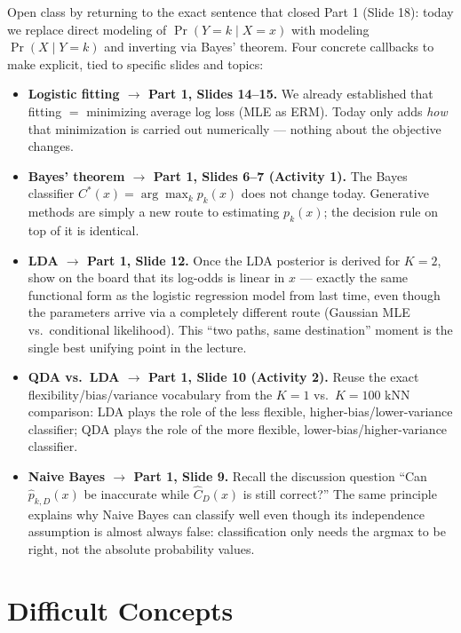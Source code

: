 \documentclass[11pt]{article}
\begin{document}
\begin{priorbox}
Open class by returning to the exact sentence that closed Part 1 (Slide 18): today we replace direct modeling of $\Pr(Y=k\mid X=x)$ with modeling $\Pr(X\mid Y=k)$ and inverting via Bayes' theorem. Four concrete callbacks to make explicit, tied to specific slides and topics:

\begin{itemize}
\item \textbf{Logistic fitting $\to$ Part 1, Slides 14--15.} We already established that fitting $=$ minimizing average log loss (MLE as ERM). Today only adds \emph{how} that minimization is carried out numerically --- nothing about the objective changes.
\item \textbf{Bayes' theorem $\to$ Part 1, Slides 6--7 (Activity 1).} The Bayes classifier $C^*(x)=\arg\max_k p_k(x)$ does not change today. Generative methods are simply a new route to estimating $p_k(x)$; the decision rule on top of it is identical.
\item \textbf{LDA $\to$ Part 1, Slide 12.} Once the LDA posterior is derived for $K=2$, show on the board that its log-odds is linear in $x$ --- exactly the same functional form as the logistic regression model from last time, even though the parameters arrive via a completely different route (Gaussian MLE vs.\ conditional likelihood). This ``two paths, same destination'' moment is the single best unifying point in the lecture.
\item \textbf{QDA vs.\ LDA $\to$ Part 1, Slide 10 (Activity 2).} Reuse the exact flexibility/bias/variance vocabulary from the $K=1$ vs.\ $K=100$ kNN comparison: LDA plays the role of the less flexible, higher-bias/lower-variance classifier; QDA plays the role of the more flexible, lower-bias/higher-variance classifier.
\item \textbf{Naive Bayes $\to$ Part 1, Slide 9.} Recall the discussion question ``Can $\hat p_{k,D}(x)$ be inaccurate while $\hat C_D(x)$ is still correct?'' The same principle explains why Naive Bayes can classify well even though its independence assumption is almost always false: classification only needs the argmax to be right, not the absolute probability values.
\end{itemize}
\end{priorbox}

\section{Difficult Concepts}
\end{document}
